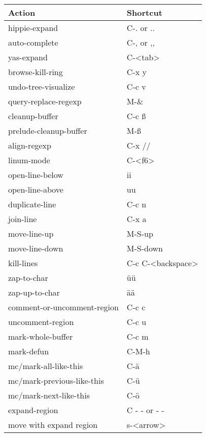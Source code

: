 \documentclass[english]{rcalibritwocolumn}
\begin{document}
\begin{center}
\begin{tabular}{ll}
 \textbf{Action}              &  \textbf{Shortcut}  \\
\hline
 hippie-expand                &  C-. or ..          \\
 auto-complete                &  C-, or ,,          \\
 yas-expand                   &  C-<tab>            \\
\hline
 browse-kill-ring             &  C-x y              \\
 undo-tree-visualize          &  C-c v              \\
 query-replace-regexp         &  M-\&               \\
 cleanup-buffer               &  C-c ß              \\
 prelude-cleanup-buffer       &  M-ß                \\
 align-regexp                 &  C-x //             \\
 linum-mode                   &  C-<f6>             \\
\hline
 open-line-below              &  ii                 \\
 open-line-above              &  uu                 \\
 duplicate-line               &  C-c n              \\
 join-line                    &  C-x a              \\
 move-line-up                 &  M-S-up             \\
 move-line-down               &  M-S-down           \\
 kill-lines                   &  C-c C-<backspace>  \\
\hline
 zap-to-char                  &  üü                 \\
 zap-up-to-char               &  ää                 \\
\hline
 comment-or-uncomment-region  &  C-c c              \\
 uncomment-region             &  C-c u              \\
\hline
 mark-whole-buffer            &  C-c m              \\
 mark-defun                   &  C-M-h              \\
 mc/mark-all-like-this        &  C-ä                \\
 mc/mark-previous-like-this   &  C-ü                \\
 mc/mark-next-like-this       &  C-ö                \\
 expand-region                &  C - - or - -       \\
 move with expand region      &  s-<arrow>          \\
\end{tabular}
\end{center}
\end{document}
